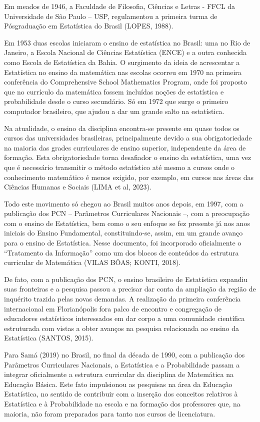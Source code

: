 \documentclass[
  letterpaper,
  DIV=11,
  numbers=noendperiod]{scrreprt}
\begin{document}
Em meados de 1946, a Faculdade de Filosofia, Ciências e Letras - FFCL da
Universidade de São Paulo -- USP, regulamentou a primeira turma de
Pósgraduação em Estatística do Brasil (LOPES, 1988).

Em 1953 duas escolas iniciaram o ensino de estatística no Brasil: uma no
Rio de Janeiro, a Escola Nacional de Ciências Estatística (ENCE) e a
outra conhecida como Escola de Estatística da Bahia. O surgimento da
ideia de acrescentar a Estatística no ensino da matemática nas escolas
ocorreu em 1970 na primeira conferência do Comprehensive School
Mathematics Program, onde foi proposto que no currículo da matemática
fossem incluídas noções de estatística e probabilidade desde o curso
secundário. Só em 1972 que surge o primeiro computador brasileiro, que
ajudou a dar um grande salto na estatística.

Na atualidade, o ensino da disciplina encontra-se presente em quase
todos os cursos das universidades brasileiras, principalmente devido a
sua obrigatoriedade na maioria das grades curriculares de ensino
superior, independente da área de formação. Esta obrigatoriedade torna
desafiador o ensino da estatística, uma vez que é necessário transmitir
o método estatístico até mesmo a cursos onde o conhecimento matemático é
menos exigido, por exemplo, em cursos nas áreas das Ciências Humanas e
Sociais (LIMA et al, 2023).

Todo este movimento só chegou ao Brasil muitos anos depois, em 1997, com
a publicação dos PCN -- Parâmetros Curriculares Nacionais --, com a
preocupação com o ensino de Estatística, bem como o seu enfoque se fez
presente já nos anos iniciais do Ensino Fundamental, constituindo-se,
assim, em um grande avanço para o ensino de Estatística. Nesse
documento, foi incorporado oficialmente o ``Tratamento da Informação''
como um dos blocos de conteúdos da estrutura curricular de Matemática
(VILAS BÔAS; KONTI, 2018).

De fato, com a publicação dos PCN, o ensino brasileiro de Estatística
expandiu suas fronteiras e a pesquisa passou a precisar dar conta da
ampliação da região de inquérito trazida pelas novas demandas. A
realização da primeira conferência internacional em Florianópolis fora
palco de encontro e congregação de educadores estatísticos interessados
em dar corpo a uma comunidade científica estruturada com vistas a obter
avanços na pesquisa relacionada ao ensino da Estatística (SANTOS, 2015).

Para Samá (2019) no Brasil, no final da década de 1990, com a publicação
dos Parâmetros Curriculares Nacionais, a Estatística e a Probabilidade
passam a integrar oficialmente a estrutura curricular da disciplina de
Matemática na Educação Básica. Este fato impulsionou as pesquisas na
área da Educação Estatística, no sentido de contribuir com a inserção
dos conceitos relativos à Estatística e à Probabilidade na escola e na
formação dos professores que, na maioria, não foram preparados para
tanto nos cursos de licenciatura.
\end{document}
